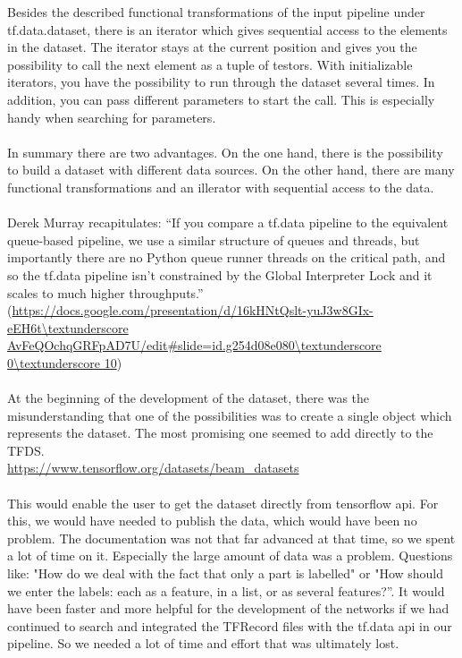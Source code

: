 Besides the described functional transformations of the input pipeline under tf.data.dataset, there is an iterator which gives sequential access to the elements in the dataset. The iterator stays at the current position and gives you the possibility to call the next element as a tuple of testors. With initializable iterators, you have the possibility to run through the dataset several times. In addition, you can pass different parameters to start the call. This is especially handy when searching for parameters. \\
\\
In summary there are two advantages. On the one hand, there is the possibility to build a dataset with different data sources. On the other hand, there are many functional transformations and an illerator with sequential access to the data. \\
\\
Derek Murray recapitulates: “If you compare a tf.data pipeline to the equivalent queue-based pipeline, we use a similar structure of queues and threads, but importantly there are no Python queue runner threads on the critical path, and so the tf.data pipeline isn’t constrained by the Global Interpreter Lock and it scales to much higher throughputs.” \\ (\url{https://docs.google.com/presentation/d/16kHNtQslt-yuJ3w8GIx-eEH6t\textunderscore AvFeQOchqGRFpAD7U/edit#slide=id.g254d08e080\textunderscore 0\textunderscore 10}) \\
\\
At the beginning of the development of the dataset, there was the misunderstanding that one of the possibilities was to create a single object which represents the dataset. The most promising one seemed to add directly to the TFDS. \\
\url{https://www.tensorflow.org/datasets/beam_datasets} \\
\\
This would enable the user to get the dataset directly from tensorflow api. For this, we would have needed to publish the data, which would have been no problem. The documentation was not that far advanced at that time, so we spent a lot of time on it. Especially the large amount of data was a problem. Questions like: "How do we deal with the fact that only a part is labelled" or "How should we enter the labels: each as a feature, in a list, or as several features?”. It would have been faster and more helpful for the development of the networks if we had continued to search and integrated the TFRecord files with the tf.data api in our pipeline. So we needed a lot of time and effort that was ultimately lost. 
